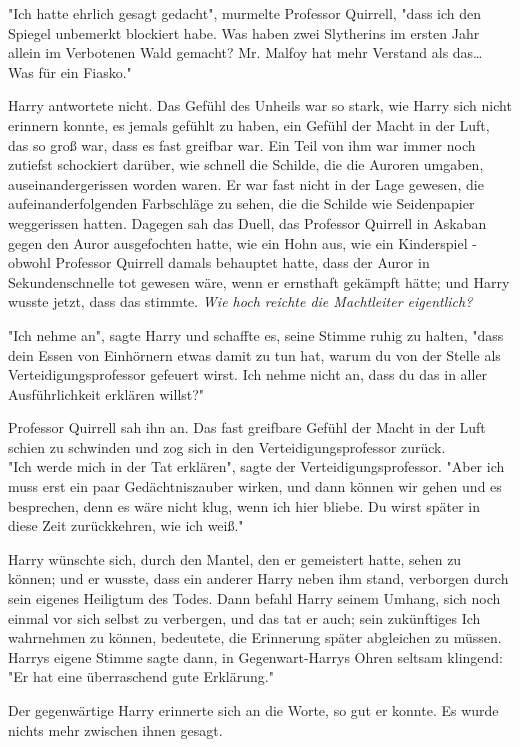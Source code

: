 {"Ich hatte ehrlich gesagt gedacht", murmelte Professor Quirrell, "dass ich den Spiegel unbemerkt blockiert habe. Was haben zwei Slytherins im ersten Jahr allein im Verbotenen Wald gemacht? Mr. Malfoy hat mehr Verstand als das… Was für ein Fiasko."

Harry antwortete nicht. Das Gefühl des Unheils war so stark, wie Harry sich nicht erinnern konnte, es jemals gefühlt zu haben, ein Gefühl der Macht in der Luft, das so groß war, dass es fast greifbar war. Ein Teil von ihm war immer noch zutiefst schockiert darüber, wie schnell die Schilde, die die Auroren umgaben, auseinandergerissen worden waren. Er war fast nicht in der Lage gewesen, die aufeinanderfolgenden Farbschläge zu sehen, die die Schilde wie Seidenpapier weggerissen hatten. Dagegen sah das Duell, das Professor Quirrell in Askaban gegen den Auror ausgefochten hatte, wie ein Hohn aus, wie ein Kinderspiel - obwohl Professor Quirrell damals behauptet hatte, dass der Auror in Sekundenschnelle tot gewesen wäre, wenn er ernsthaft gekämpft hätte; und Harry wusste jetzt, dass das stimmte. \emph{Wie hoch reichte die Machtleiter eigentlich?}

"Ich nehme an", sagte Harry und schaffte es, seine Stimme ruhig zu halten, "dass dein Essen von Einhörnern etwas damit zu tun hat, warum du von der Stelle als Verteidigungsprofessor gefeuert wirst. Ich nehme nicht an, dass du das in aller Ausführlichkeit erklären willst?"

Professor Quirrell sah ihn an. Das fast greifbare Gefühl der Macht in der Luft schien zu schwinden und zog sich in den Verteidigungsprofessor zurück.\\ "Ich werde mich in der Tat erklären", sagte der Verteidigungsprofessor. "Aber ich muss erst ein paar Gedächtniszauber wirken, und dann können wir gehen und es besprechen, denn es wäre nicht klug, wenn ich hier bliebe. Du wirst später in diese Zeit zurückkehren, wie ich weiß."

Harry wünschte sich, durch den Mantel, den er gemeistert hatte, sehen zu können; und er wusste, dass ein anderer Harry neben ihm stand, verborgen durch sein eigenes Heiligtum des Todes. Dann befahl Harry seinem Umhang, sich noch einmal vor sich selbst zu verbergen, und das tat er auch; sein zukünftiges Ich wahrnehmen zu können, bedeutete, die Erinnerung später abgleichen zu müssen. Harrys eigene Stimme sagte dann, in Gegenwart-Harrys Ohren seltsam klingend: "Er hat eine überraschend gute Erklärung."

Der gegenwärtige Harry erinnerte sich an die Worte, so gut er konnte. Es wurde nichts mehr zwischen ihnen gesagt.

}
